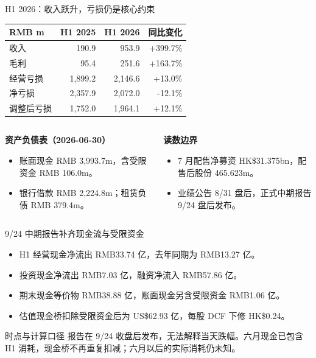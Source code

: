 \documentclass[aspectratio=169,11pt]{beamer}
\newcommand{\smallnote}[1]{\vspace{0.2em}{\footnotesize #1}}
\begin{document}
\begin{frame}{H1 2026：收入跃升，亏损仍是核心约束}
  \vspace{-0.3em}
  \begin{table}
    \centering
    \scriptsize
    \begin{tabular}{lrrr}
      \toprule
      RMB m & H1 2025 & H1 2026 & 同比变化 \\
      \midrule
      收入 & 190.9 & 953.9 & +399.7\% \\
      毛利 & 95.4 & 251.6 & +163.7\% \\
      经营亏损 & 1,899.2 & 2,146.6 & +13.0\% \\
      净亏损 & 2,357.9 & 2,072.0 & -12.1\% \\
      调整后亏损 & 1,752.0 & 1,964.1 & +12.1\% \\
      \bottomrule
    \end{tabular}
  \end{table}
  \smallnote{研发开支 RMB 2,131.2m，同比增长 33.6\%；净亏损收窄含金融工具公允价值变动影响，调整后亏损仍在扩大。}
  \begin{columns}[T,onlytextwidth]
    \begin{column}{0.48\textwidth}
      \textbf{资产负债表（2026-06-30）}
      \begin{itemize}
        \item 账面现金 RMB 3,993.7m，含受限资金 RMB 106.0m。
        \item 银行借款 RMB 2,224.8m；租赁负债 RMB 379.4m。
      \end{itemize}
    \end{column}
    \begin{column}{0.48\textwidth}
      \textbf{读数边界}
      \begin{itemize}
        \item 7 月配售净募资 HK\$31.375bn，配售后股份 465.623m。
        \item 业绩公告 8/31 盘后，正式中期报告 9/24 盘后发布。
      \end{itemize}
    \end{column}
  \end{columns}
\end{frame}

\begin{frame}{9/24 中期报告补齐现金流与受限资金}
  \begin{itemize}
    \item H1 经营现金净流出 RMB33.74 亿，去年同期为 RMB13.27 亿。
    \item 投资现金净流出 RMB7.03 亿，融资净流入 RMB57.86 亿。
    \item 期末现金等价物 RMB38.88 亿，账面现金另含受限资金 RMB1.06 亿。
    \item 估值现金桥扣除受限资金后为 US\$62.93 亿，每股 DCF 下修 HK\$0.24。
  \end{itemize}
  \begin{block}{时点与计算口径}
    报告在 9/24 收盘后发布，无法解释当天跌幅。六月现金已包含 H1 消耗，现金桥不再重复扣减；六月以后的实际消耗仍未知。
  \end{block}
  \smallnote{来源：港交所 2026 中期报告，第 60--61 页现金流量表及第 74 页附注 14。}
\end{frame}
\end{document}
